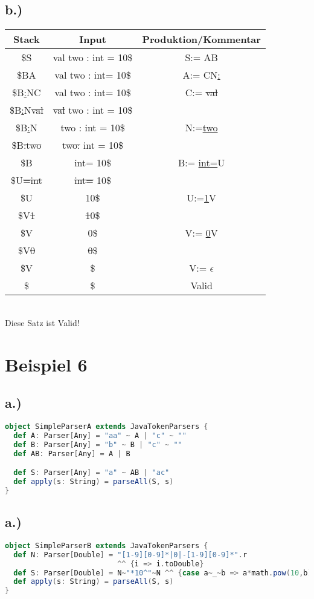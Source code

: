 \documentclass[12pt,runningheads,a4paper]{llncs}
\begin{document}
 \subsection*{b.)}
\begin{tabular}{ |c|c|c|  }

 \hline
 Stack&Input &Produktion/Kommentar\\ 
 \hline
 \$S &val two : int = 10\$ &S:= AB \\
  \hline
 \$BA &val two : int= 10\$ &A:= CN\underline{:}\\
 \hline
 \$B\underline{:}NC &val two : int= 10\$ &C:= \st{val}\\
 \hline
 \$B\underline{:}N\st{val} &\st{val} two : int = 10\$ &\\
   \hline
 \$B\underline{:}N &two : int = 10\$ &N:=\underline{two} \\
   \hline
 \$B\st{:}\st{two} &\st{two}\st{:} int = 10\$ & \\
   \hline
 \$B &int= 10\$ & B:= \underline{int}\underline{=}U \\
   \hline
 \$U\st{=}\st{int} &\st{int}\st{=} 10\$ & \\
   \hline
 \$U  &10\$ & U:=\underline{1}V \\
   \hline
 \$V\st{1} &\st{1}0\$ &\\
   \hline
 \$V &0\$ &V:= \underline{0}V\\
   \hline
 \$V\st{0}  &\st{0}\$ & \\
   \hline
 \$V  &\$  &V:= $\epsilon$\\
   \hline
 \$ &\$ &Valid \\
 \hline

 \end{tabular}\\
Diese Satz ist Valid!
\\


\section*{Beispiel 6}
\subsection*{a.)}
\begin{lstlisting}[language=scala]
object SimpleParserA extends JavaTokenParsers {
  def A: Parser[Any] = "aa" ~ A | "c" ~ ""
  def B: Parser[Any] = "b" ~ B | "c" ~ ""
  def AB: Parser[Any] = A | B

  def S: Parser[Any] = "a" ~ AB | "ac"
  def apply(s: String) = parseAll(S, s)
}
\end{lstlisting}
\subsection*{a.)}
\begin{lstlisting}[language=scala]
object SimpleParserB extends JavaTokenParsers {
  def N: Parser[Double] = "[1-9][0-9]*|0|-[1-9][0-9]*".r 
                          ^^ {i => i.toDouble}
  def S: Parser[Double] = N~"*10^"~N ^^ {case a~_~b => a*math.pow(10,b)}
  def apply(s: String) = parseAll(S, s)
}
\end{lstlisting}
\end{document}
